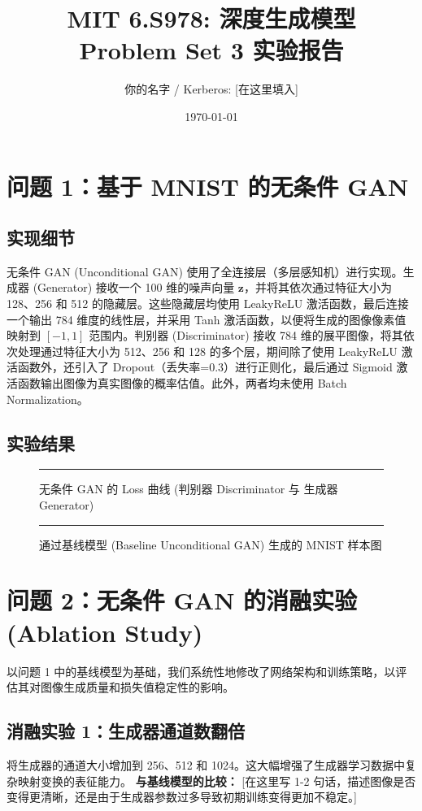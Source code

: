 \documentclass[11pt,UTF8]{ctexart}
\title{MIT 6.S978: 深度生成模型 \\ Problem Set 3 实验报告}
\author{你的名字 / Kerberos: [在这里填入]}
\date{\today}
\begin{document}
\maketitle

\section*{问题 1：基于 MNIST 的无条件 GAN}
\subsection*{实现细节}
无条件 GAN (Unconditional GAN) 使用了全连接层（多层感知机）进行实现。生成器 (Generator) 接收一个 100 维的噪声向量 $\mathbf{z}$，并将其依次通过特征大小为 128、256 和 512 的隐藏层。这些隐藏层均使用 LeakyReLU 激活函数，最后连接一个输出 784 维度的线性层，并采用 Tanh 激活函数，以便将生成的图像像素值映射到 $[-1, 1]$ 范围内。判别器 (Discriminator) 接收 784 维的展平图像，将其依次处理通过特征大小为 512、256 和 128 的多个层，期间除了使用 LeakyReLU 激活函数外，还引入了 Dropout（丢失率=0.3）进行正则化，最后通过 Sigmoid 激活函数输出图像为真实图像的概率估值。此外，两者均未使用 Batch Normalization。

\subsection*{实验结果}
\begin{figure}[H]
    \centering
    \rule{10cm}{5cm} %
    \caption{无条件 GAN 的 Loss 曲线 (判别器 Discriminator 与 生成器 Generator)}
\end{figure}

\begin{figure}[H]
    \centering
    \rule{10cm}{5cm} %
    \caption{通过基线模型 (Baseline Unconditional GAN) 生成的 MNIST 样本图}
\end{figure}

\section*{问题 2：无条件 GAN 的消融实验 (Ablation Study)}
以问题 1 中的基线模型为基础，我们系统性地修改了网络架构和训练策略，以评估其对图像生成质量和损失值稳定性的影响。

\subsection*{消融实验 1：生成器通道数翻倍}
将生成器的通道大小增加到 256、512 和 1024。这大幅增强了生成器学习数据中复杂映射变换的表征能力。
\textbf{与基线模型的比较：} [在这里写 1-2 句话，描述图像是否变得更清晰，还是由于生成器参数过多导致初期训练变得更加不稳定。]
\end{document}
